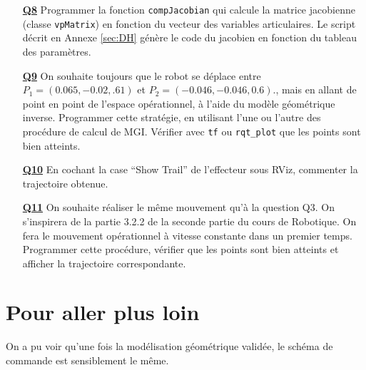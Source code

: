 \documentclass[12pt,a4paper]{article}
\begin{document}
\begin{itemize}
 \medskip\item[\textbf{\underline{Q8}}] Programmer la fonction \texttt{compJacobian} qui calcule la matrice jacobienne (classe \texttt{vpMatrix}) en fonction du vecteur des variables articulaires.
 Le script décrit en Annexe \ref{sec:DH} génère le code du jacobien en fonction du tableau des paramètres.
 
 \medskip\item[\textbf{\underline{Q9}}] On souhaite toujours que le robot se déplace entre $P_1=(0.065,-0.02,.61)$ et $P_2=(-0.046, -0.046,  0.6)$., mais en allant de point en point de l'espace opérationnel, à l'aide du modèle géométrique inverse.
Programmer cette stratégie, en utilisant l'une ou l'autre des procédure de calcul de MGI.
 Vérifier avec  \texttt{tf} ou  \texttt{rqt\_plot} que les points sont bien atteints.
 
 
 \medskip\item[\textbf{\underline{Q10}}] En cochant la case ``Show Trail'' de l'effecteur sous RViz, commenter la trajectoire obtenue.
 
 \medskip\item[\textbf{\underline{Q11}}] On souhaite réaliser le même mouvement qu'à la question Q3.
 On s'inspirera de la partie 3.2.2 de la seconde partie du cours de Robotique. On fera le mouvement opérationnel à vitesse constante dans un premier temps. Programmer cette procédure, vérifier que les points sont bien atteints et afficher la trajectoire correspondante.
  

 \end{itemize}
 
 \newpage
\section{Pour aller plus loin}
 
 On a pu voir qu'une fois la modélisation géométrique validée, le schéma de commande est sensiblement le même. 
\end{document}
